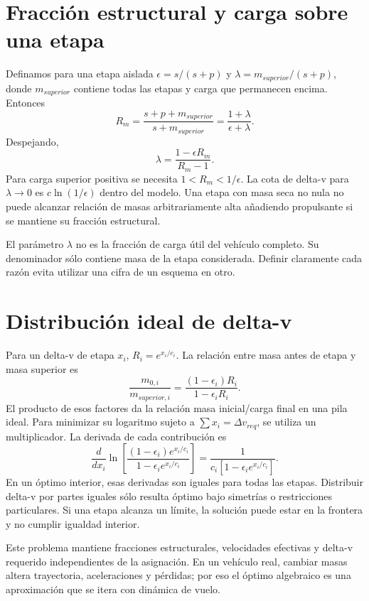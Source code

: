 \section{Fracción estructural y carga sobre una etapa}
Definamos para una etapa aislada $\epsilon=s/(s+p)$ y $\lambda=m_{superior}/(s+p)$, donde $m_{superior}$ contiene todas las etapas y carga que permanecen encima. Entonces
\[
 R_m=\frac{s+p+m_{superior}}{s+m_{superior}}
 =\frac{1+\lambda}{\epsilon+\lambda}.
\]
Despejando,
\begin{equation}\label{eq:payloadlambda}
 \lambda=\frac{1-\epsilon R_m}{R_m-1}.
\end{equation}
Para carga superior positiva se necesita $1<R_m<1/\epsilon$. La cota de delta-v para $\lambda\to0$ es $c\ln(1/\epsilon)$ dentro del modelo. Una etapa con masa seca no nula no puede alcanzar relación de masas arbitrariamente alta añadiendo propulsante si se mantiene su fracción estructural.

El parámetro $\lambda$ no es la fracción de carga útil del vehículo completo. Su denominador sólo contiene masa de la etapa considerada. Definir claramente cada razón evita utilizar una cifra de un esquema en otro.
\section{Distribución ideal de delta-v}
Para un delta-v de etapa $x_i$, $R_i=e^{x_i/c_i}$. La relación entre masa antes de etapa y masa superior es
\[
 \frac{m_{0,i}}{m_{superior,i}}
 =\frac{(1-\epsilon_i)R_i}{1-\epsilon_iR_i}.
\]
El producto de esos factores da la relación masa inicial/carga final en una pila ideal. Para minimizar su logaritmo sujeto a $\sum x_i=\Delta v_{req}$, se utiliza un multiplicador. La derivada de cada contribución es
\begin{equation}
 \frac{d}{dx_i}\ln\left[
 \frac{(1-\epsilon_i)e^{x_i/c_i}}{1-\epsilon_ie^{x_i/c_i}}\right]
 =\frac{1}{c_i[1-\epsilon_ie^{x_i/c_i}]}.
\end{equation}
En un óptimo interior, esas derivadas son iguales para todas las etapas. Distribuir delta-v por partes iguales sólo resulta óptimo bajo simetrías o restricciones particulares. Si una etapa alcanza un límite, la solución puede estar en la frontera y no cumplir igualdad interior.

Este problema mantiene fracciones estructurales, velocidades efectivas y delta-v requerido independientes de la asignación. En un vehículo real, cambiar masas altera trayectoria, aceleraciones y pérdidas; por eso el óptimo algebraico es una aproximación que se itera con dinámica de vuelo.
